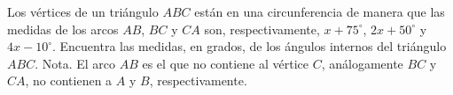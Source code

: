 Los vértices de un triángulo $ABC$ están en una circunferencia de manera que las medidas de los arcos $AB$, $BC$ y $CA$ son, respectivamente, $x + 75^\circ$, $2x + 50^\circ$ y $4x - 10^\circ$. Encuentra las medidas, en grados, de los ángulos internos del triángulo $ABC$. \newline 
Nota. El arco $AB$ es el que no contiene al vértice $C$, análogamente $BC$ y $CA$, no contienen a $A$ y $B$, respectivamente.